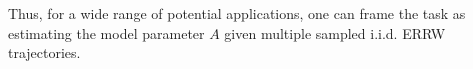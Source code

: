 \documentclass[a4paper, 11pt]{article}
\newcommand{\dkl}{D_{\textnormal{KL}}}
\begin{document}
Thus, for a wide range of potential applications, one can frame the task as estimating the model parameter $A$ given multiple sampled i.i.d. ERRW trajectories.



\end{document}
